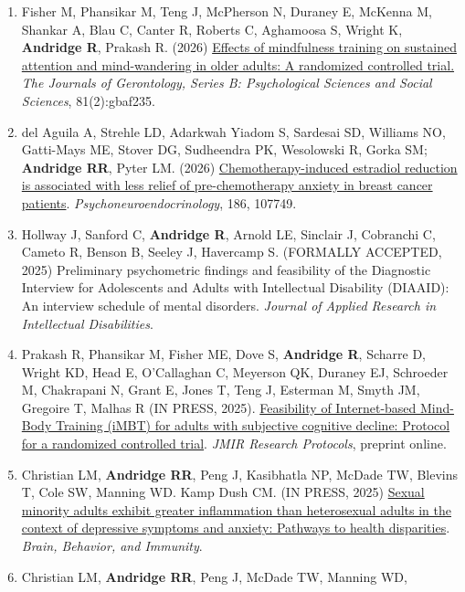 \documentclass[
  english,
  letterpaper,
  DIV=11,
  numbers=noendperiod]{scrartcl}
\providecommand{\tightlist}{%
  \setlength{\itemsep}{0pt}\setlength{\parskip}{0pt}}
\begin{document}
\begin{enumerate}
\def\labelenumi{\arabic{enumi}.}
\tightlist
\item
  Fisher M, Phansikar M, Teng J, McPherson N, Duraney E, McKenna M,
  Shankar A, Blau C, Canter R, Roberts C, Aghamoosa S, Wright K,
  \textbf{Andridge R}, Prakash R. (2026)
  \href{https://doi.org/10.1093/geronb/gbaf235}{Effects of mindfulness
  training on sustained attention and mind-wandering in older adults: A
  randomized controlled trial.} \emph{The Journals of Gerontology,
  Series B: Psychological Sciences and Social Sciences}, 81(2):gbaf235.
\item
  del Aguila A, Strehle LD, Adarkwah Yiadom S, Sardesai SD, Williams NO,
  Gatti-Mays ME, Stover DG, Sudheendra PK, Wesolowski R, Gorka SM;
  \textbf{Andridge RR}, Pyter LM. (2026)
  \href{https://doi.org/10.1016/j.psyneuen.2026.107749}{Chemotherapy-induced
  estradiol reduction is associated with less relief of pre-chemotherapy
  anxiety in breast cancer patients}. \emph{Psychoneuroendocrinology},
  186, 107749.
\item
  Hollway J, Sanford C, \textbf{Andridge R}, Arnold LE, Sinclair J,
  Cobranchi C, Cameto R, Benson B, Seeley J, Havercamp S. (FORMALLY
  ACCEPTED, 2025) Preliminary psychometric findings and feasibility of
  the Diagnostic Interview for Adolescents and Adults with Intellectual
  Disability (DIAAID): An interview schedule of mental disorders.
  \emph{Journal of Applied Research in Intellectual Disabilities}.
\item
  Prakash R, Phansikar M, Fisher ME, Dove S, \textbf{Andridge R},
  Scharre D, Wright KD, Head E, O'Callaghan C, Meyerson QK, Duraney EJ,
  Schroeder M, Chakrapani N, Grant E, Jones T, Teng J, Esterman M, Smyth
  JM, Gregoire T, Malhas R (IN PRESS, 2025).
  \href{https://doi.org/10.2196/86276}{Feasibility of Internet-based
  Mind-Body Training (iMBT) for adults with subjective cognitive
  decline: Protocol for a randomized controlled trial}. \emph{JMIR
  Research Protocols}, preprint online.
\item
  Christian LM, \textbf{Andridge RR}, Peng J, Kasibhatla NP, McDade TW,
  Blevins T, Cole SW, Manning WD. Kamp Dush CM. (IN PRESS, 2025)
  \href{https://doi.org/10.1016/j.bbi.2025.106202}{Sexual minority
  adults exhibit greater inflammation than heterosexual adults in the
  context of depressive symptoms and anxiety: Pathways to health
  disparities}. \emph{Brain, Behavior, and Immunity}.
\item
  Christian LM, \textbf{Andridge RR}, Peng J, McDade TW, Manning WD,

\end{enumerate}
\end{document}
